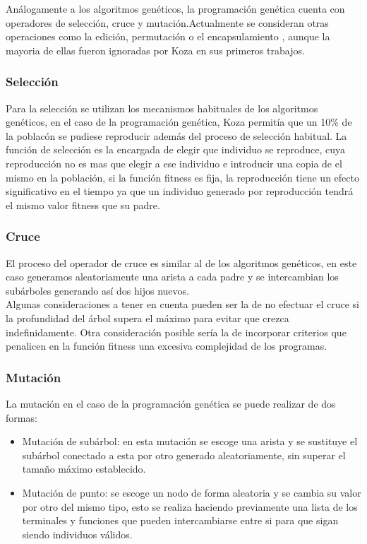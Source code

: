 \documentclass[12pt]{article} \usepackage[utf8x]{inputenc}
\begin{document}
 Análogamente a los algoritmos genéticos, la programación genética cuenta con operadores de selección, cruce y mutación.Actualmente se consideran otras operaciones como la edición, permutación o el encapsulamiento , aunque la mayoria de ellas fueron ignoradas por Koza en sus primeros trabajos.
 
 \subsubsection{Selección}
 
 Para la selección se utilizan los mecanismos habituales de los algoritmos genéticos, en el caso de la programación genética, Koza permitía que un 10\% de la poblacón se pudiese reproducir además del proceso de selección habitual. La función de selección es la encargada de elegir que individuo se reproduce, cuya reproducción no es mas que elegir a ese individuo e introducir una copia de el mismo en la población, si la función fitness es fija, la reproducción tiene un efecto significativo en el tiempo ya que un individuo generado por reproducción tendrá el mismo valor fitness que su padre.
 
 \subsubsection{Cruce}
 
 El proceso del operador de cruce es similar al de los algoritmos genéticos, en este caso generamos aleatoriamente una arista a cada padre y se intercambian los subárboles generando así dos hijos nuevos.\\
 Algunas consideraciones a tener en cuenta pueden ser la de no efectuar el cruce si la profundidad del árbol supera el máximo para evitar que crezca indefinidamente. Otra consideración posible sería la de incorporar criterios que penalicen en la función fitness una excesiva complejidad de los programas.
 
 \subsubsection{Mutación}
 
 La mutación en el caso de la programación genética se puede realizar de dos formas:
 
 \begin{itemize}
\item  Mutación de subárbol: en esta mutación se escoge una arista y se sustituye el subárbol conectado a esta por otro generado aleatoriamente, sin superar el tamaño máximo establecido.
\item  Mutación de punto: se escoge un nodo de forma aleatoria y se cambia su valor por otro del mismo tipo, esto se realiza haciendo previamente una lista de los terminales y funciones que pueden intercambiarse entre si para que sigan siendo individuos válidos.
\end{itemize}
\end{document}
